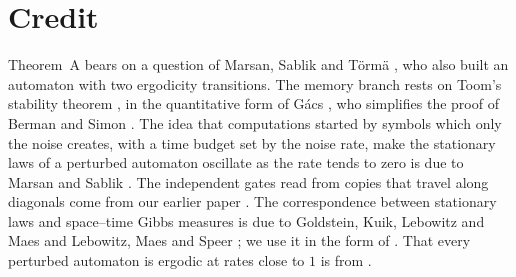 \documentclass[11pt]{article}
\theoremstyle{plain}
\theoremstyle{definition}
\theoremstyle{remark}
\begin{document}
\section*{Credit}

Theorem~A bears on a question of Marsan, Sablik and T\"orm\"a \cite{MST26}, who also built an automaton with two ergodicity transitions. The memory branch rests on Toom's stability theorem \cite{Toom80}, in the quantitative form of G\'acs \cite{Gacs21}, who simplifies the proof of Berman and Simon \cite{BermanSimon88}. The idea that computations started by symbols which only the noise creates, with a time budget set by the noise rate, make the stationary laws of a perturbed automaton oscillate as the rate tends to zero is due to Marsan and Sablik \cite{MS24}. The independent gates read from copies that travel along diagonals come from our earlier paper \cite{DMnil}. The correspondence between stationary laws and space--time Gibbs measures is due to Goldstein, Kuik, Lebowitz and Maes \cite{GKLM89} and Lebowitz, Maes and Speer \cite{LMS90}; we use it in the form of \cite{DMst}. That every perturbed automaton is ergodic at rates close to $1$ is from \cite{MST19}.
\end{document}
